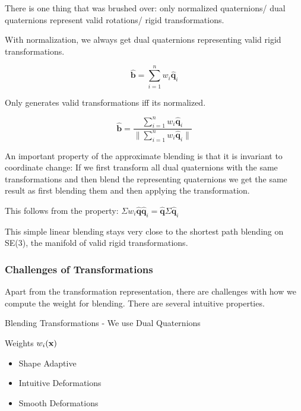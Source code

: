 \documentclass{article}
\begin{document}
There is one thing that was brushed over: only normalized quaternions/ dual quaternions represent
valid rotations/ rigid transformations.

\vspace{5px}

With normalization, we always get dual quaternions representing valid rigid transformations.

\[
    \mathbf{\hat{b}} = \sum_{i=1}^{n} w_i \mathbf{\hat{q}}_i
\]

Only generates valid transformations iff its normalized.

\[
    \mathbf{\hat{b}} = \frac{\sum_{i=1}^{n} w_i \mathbf{\hat{q}}_i}
    {\lVert \sum_{i=1}^{n} w_i \mathbf{\hat{q}}_i \rVert}
\]


An important property of the approximate blending is that it is invariant to coordinate change:
If we first transform all dual quaternions with the same transformations and then blend the representing
quaternions we get the same result as first blending them and then applying the transformation.

\vspace{5px}

This follows from the property: \(\Sigma w_i \mathbf{\hat{q}} \mathbf{\hat{q}}_i = \mathbf{\hat{q}} \Sigma \mathbf{\hat{q}}_i\)

\vspace{10px}

This simple linear blending stays very close to the shortest path blending on SE(3), the manifold of 
valid rigid transformations.

\newpage

\subsubsection{Challenges of Transformations}

Apart from the transformation representation, there are challenges with how we compute the weight for 
blending. There are several intuitive properties.

Blending Transformations - We use Dual Quaternions

\vspace{5px}

Weights \(w_i(\text{\textbf{x}})\)

\begin{itemize}
    \item Shape Adaptive
    \item Intuitive Deformations
    \item Smooth Deformations
\end{itemize}
\end{document}
